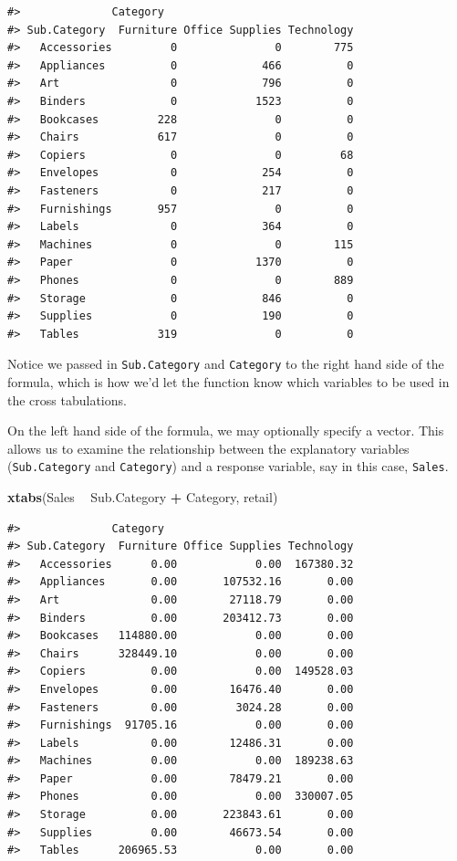 \documentclass[]{article}
\newenvironment{Shaded}{\begin{snugshade}}{\end{snugshade}}
\newcommand{\KeywordTok}[1]{\textcolor[rgb]{0.13,0.29,0.53}{\textbf{#1}}}
\newcommand{\NormalTok}[1]{#1}
\newcommand{\OperatorTok}[1]{\textcolor[rgb]{0.81,0.36,0.00}{\textbf{#1}}}
\newcommand{\StringTok}[1]{\textcolor[rgb]{0.31,0.60,0.02}{#1}}
\begin{document}
\begin{verbatim}
#>              Category
#> Sub.Category  Furniture Office Supplies Technology
#>   Accessories         0               0        775
#>   Appliances          0             466          0
#>   Art                 0             796          0
#>   Binders             0            1523          0
#>   Bookcases         228               0          0
#>   Chairs            617               0          0
#>   Copiers             0               0         68
#>   Envelopes           0             254          0
#>   Fasteners           0             217          0
#>   Furnishings       957               0          0
#>   Labels              0             364          0
#>   Machines            0               0        115
#>   Paper               0            1370          0
#>   Phones              0               0        889
#>   Storage             0             846          0
#>   Supplies            0             190          0
#>   Tables            319               0          0
\end{verbatim}

Notice we passed in \texttt{Sub.Category} and \texttt{Category} to the
right hand side of the formula, which is how we'd let the function know
which variables to be used in the cross tabulations.

On the left hand side of the formula, we may optionally specify a
vector. This allows us to examine the relationship between the
explanatory variables (\texttt{Sub.Category} and \texttt{Category}) and
a response variable, say in this case, \texttt{Sales}.

\begin{Shaded}
\begin{Highlighting}[]
\KeywordTok{xtabs}\NormalTok{(Sales }\OperatorTok{~}\StringTok{ }\NormalTok{Sub.Category }\OperatorTok{+}\StringTok{ }\NormalTok{Category, retail)}
\end{Highlighting}
\end{Shaded}

\begin{verbatim}
#>              Category
#> Sub.Category  Furniture Office Supplies Technology
#>   Accessories      0.00            0.00  167380.32
#>   Appliances       0.00       107532.16       0.00
#>   Art              0.00        27118.79       0.00
#>   Binders          0.00       203412.73       0.00
#>   Bookcases   114880.00            0.00       0.00
#>   Chairs      328449.10            0.00       0.00
#>   Copiers          0.00            0.00  149528.03
#>   Envelopes        0.00        16476.40       0.00
#>   Fasteners        0.00         3024.28       0.00
#>   Furnishings  91705.16            0.00       0.00
#>   Labels           0.00        12486.31       0.00
#>   Machines         0.00            0.00  189238.63
#>   Paper            0.00        78479.21       0.00
#>   Phones           0.00            0.00  330007.05
#>   Storage          0.00       223843.61       0.00
#>   Supplies         0.00        46673.54       0.00
#>   Tables      206965.53            0.00       0.00
\end{verbatim}
\end{document}
